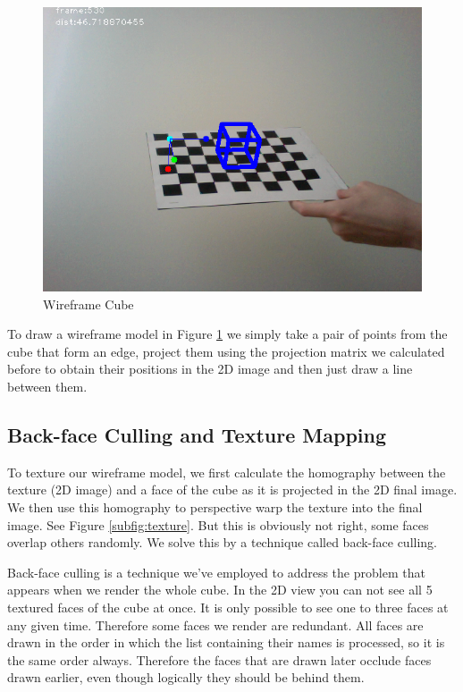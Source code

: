  \begin{figure}[h!]
	\centering
	\includegraphics[width=\textwidth]{final/images/wireframe.png}
	\caption{Wireframe Cube}
	\label{fig:wireframe}
\end{figure}

To draw a wireframe model in Figure \ref{fig:wireframe} we simply take a pair of points from the cube that form an edge, project them using the projection matrix we calculated before to obtain their positions in the 2D image and then just draw a line between them.

\subsection{Back-face Culling and Texture Mapping}

To texture our wireframe model, we first calculate the homography between the texture (2D image) and a face of the cube as it is projected in the 2D final image. We then use this homography to perspective warp the texture into the final image. See Figure \ref{subfig:texture}. But this is obviously not right, some faces overlap others randomly. We solve this by a technique called back-face culling.

Back-face culling is a technique we've employed to address the problem that appears when we render the whole cube. In the 2D view you can not see all 5 textured faces of the cube at once. It is only possible to see one to three faces at any given time. Therefore some faces we render are redundant. All faces are drawn in the order in which the list containing their names is processed, so it is the same order always. Therefore the faces that are drawn later occlude faces drawn earlier, even though logically they should be behind them. 

